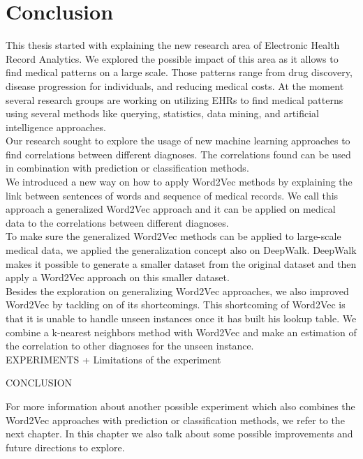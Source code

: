 \chapter{Conclusion}
\label{cha:conclusion}

This thesis started with explaining the new research area of Electronic Health Record Analytics. We explored the possible impact of this area as it allows to find medical patterns on a large scale. Those patterns range from drug discovery, disease progression for individuals, and reducing medical costs. At the moment several research groups are working on utilizing EHRs to find medical patterns using several methods like querying, statistics, data mining, and artificial intelligence approaches. \\
Our research sought to explore the usage of new machine learning approaches to find correlations between different diagnoses. The correlations found can be used in combination with prediction or classification methods. \\

We introduced a new way on how to apply Word2Vec methods by explaining the link between sentences of words and sequence of medical records. We call this approach a generalized Word2Vec approach and it can be applied on medical data to the correlations between different diagnoses. \\
To make sure the generalized Word2Vec methods can be applied to large-scale medical data, we applied the generalization concept also on DeepWalk. DeepWalk makes it possible to generate a smaller dataset from the original dataset and then apply a Word2Vec approach on this smaller dataset. \\
Besides the exploration on generalizing Word2Vec approaches, we also improved Word2Vec by tackling on of its shortcomings. This shortcoming of Word2Vec is that it is unable to handle unseen instances once it has built his lookup table. We combine a k-nearest neighbors method with Word2Vec and make an estimation of the correlation to other diagnoses for the unseen instance. \\

EXPERIMENTS + Limitations of the experiment

CONCLUSION

For more information about another possible experiment which also combines the Word2Vec approaches with prediction or classification methods, we refer to the next chapter. In this chapter we also talk about some possible improvements and future directions to explore.

